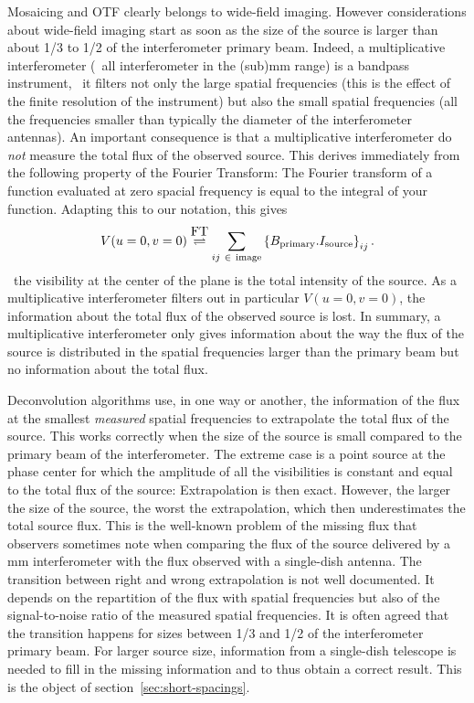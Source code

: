 Mosaicing and OTF clearly belongs to wide-field imaging. However
considerations about wide-field imaging start as soon as the size of the
source is larger than about 1/3 to 1/2 of the interferometer primary beam.
Indeed, a multiplicative interferometer (\eg\ all interferometer in the
(sub)mm range) is a bandpass instrument, \ie\ it filters not only the large
spatial frequencies (this is the effect of the finite resolution of the
instrument) but also the small spatial frequencies (all the frequencies
smaller than typically the diameter of the interferometer antennas). An
important consequence is that a multiplicative interferometer do \emph{not}
measure the total flux of the observed source. This derives immediately
from the following property of the Fourier Transform: The Fourier transform
of a function evaluated at zero spacial frequency is equal to the integral
of your function. Adapting this to our notation, this gives
\begin{equation}
  V(u=0,v=0) \stackrel{\mbox{FT}}{\rightleftharpoons} \sum_{ij~\in~\mathrm{image}} \displaystyle\left\{ B_{\mathrm{primary}}.I_{\mathrm{source}} \right\}_{ij}.
\end{equation}
\ie\ the visibility at the center of the \uv{} plane is the total intensity
of the source. As a multiplicative interferometer filters out in particular
$V(u=0,v=0)$, the information about the total flux of the observed source
is lost. In summary, a multiplicative interferometer only gives information
about the way the flux of the source is distributed in the spatial
frequencies larger than the primary beam but no information about the total
flux.

Deconvolution algorithms use, in one way or another, the information of the
flux at the smallest \emph{measured} spatial frequencies to extrapolate the
total flux of the source. This works correctly when the size of the source
is small compared to the primary beam of the interferometer. The extreme
case is a point source at the phase center for which the amplitude of all
the visibilities is constant and equal to the total flux of the source:
Extrapolation is then exact. However, the larger the size of the source,
the worst the extrapolation, which then underestimates the total source
flux. This is the well-known problem of the missing flux that observers
sometimes note when comparing the flux of the source delivered by a mm
interferometer with the flux observed with a single-dish antenna. The
transition between right and wrong extrapolation is not well documented. It
depends on the repartition of the flux with spatial frequencies but also of
the signal-to-noise ratio of the measured spatial frequencies. It is often
agreed that the transition happens for sizes between 1/3 and 1/2 of the
interferometer primary beam. For larger source size, information from a
single-dish telescope is needed to fill in the missing information and to
thus obtain a correct result. This is the object of
section~\ref{sec:short-spacings}.

